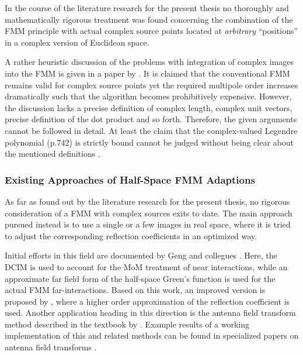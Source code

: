 In the course of the literature research for the present thesis no thoroughly
and  mathematically rigorous treatment was found concerning the combination
of the \ac{FMM} principle with actual complex source points located at
\emph{arbitrary} \enquote{positions} in a complex version of Euclidean space.

A rather heuristic discussion of the problems with integration of complex
images into the \ac{FMM} is given in a paper by \textcite{Geng2001}.
It is claimed that the conventional \ac{FMM} remains valid for complex source 
points yet the required multipole order increases dramatically such that the
algorithm becomes prohibitively expensive.
However, the discussion lacks a precise definition of complex length,
complex unit vectors, precise definition of the dot product and so forth.
Therefore, the given arguments cannot be followed in detail.
At least the claim that the complex-valued Legendre polynomial (p.742) is
strictly bound cannot be judged without being clear about the mentioned
definitions \cite[pp.~375]{Olver2010}.







\subsubsection{Existing Approaches of Half-Space FMM Adaptions}

As far as found out by the literature research for the present thesis, no
rigorous consideration of a \ac{FMM} with complex sources exits to date.
The main approach pursued instead is to use a single or a few
images in real space, where it is tried to adjust the corresponding
reflection coefficients in an optimized way.

Initial efforts in this field are documented by Geng and collegues
\cite{Geng1999,Geng2000,Geng2001}.
Here, the \ac{DCIM} is used to account for the \ac{MoM} treatment of near
interactions, while an approximate far field form of the half-space Green's
function is used for the actual \ac{FMM} far-interactions.
Based on this work, an improved version is proposed by \textcite{Liu2002},
where a higher order approximation of the reflection coefficient is used.
Another application heading in this direction is the antenna field transform
method described in the textbook by \textcite[Section~8.13.2]{parini2020}.
Example results of a working implementation of this and related methods can be
found in specialized papers on antenna field transforms
\cite{Eibert2018,Eibert2018a,Eibert2019}.






